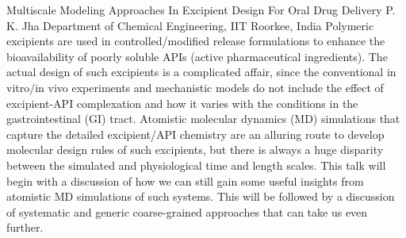 
    \begin{abstract_online}{Multiscale Modeling Approaches In Excipient Design For Oral Drug Delivery}{%
        P. K. Jha}{%
        \IStag}{%
        Department of Chemical Engineering, IIT Roorkee, India}
    Polymeric excipients are used in controlled/modified release formulations to enhance the bioavailability of poorly soluble APIs (active pharmaceutical ingredients). The actual design of such excipients is a complicated affair, since the conventional in vitro/in vivo experiments and mechanistic models do not include the effect of excipient-API complexation and how it varies with the conditions in the gastrointestinal (GI) tract. Atomistic molecular dynamics (MD) simulations that capture the detailed excipient/API chemistry are an alluring route to develop molecular design rules of such excipients, but there is always a huge disparity between the simulated and physiological time and length scales. This talk will begin with a discussion of how we can still gain some useful insights from atomistic MD simulations of such systems. This will be followed by a discussion of systematic and generic coarse-grained approaches that can take us even further. 
    
    \end{abstract_online}
    